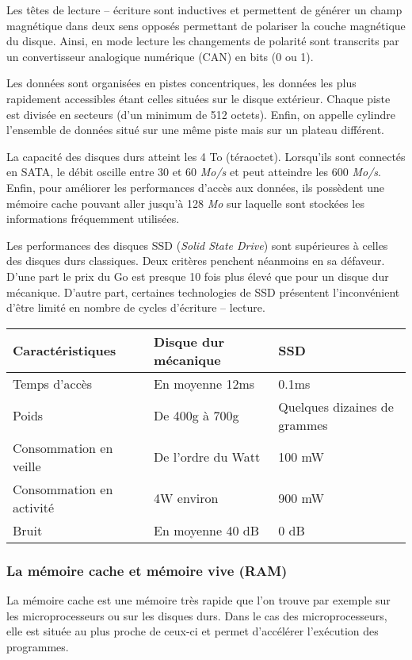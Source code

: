 Les têtes de lecture -- écriture sont inductives et permettent de générer un champ magnétique dans deux sens opposés permettant de polariser la couche magnétique du disque. Ainsi, en mode lecture les changements de polarité sont transcrits par un convertisseur analogique numérique (CAN) en bits (0 ou 1).

Les données sont organisées en pistes concentriques, les données les plus rapidement accessibles étant celles situées sur le disque extérieur. Chaque piste est divisée en secteurs (d'un minimum de 512 octets). Enfin, on appelle cylindre l'ensemble de données situé sur une même piste mais sur un plateau différent. 


La capacité des disques durs atteint les 4 To (téraoctet). Lorsqu'ils sont connectés en SATA, le débit oscille entre 30 et 60 \textit{Mo/s} et peut atteindre les 600 \textit{Mo/s}. Enfin, pour améliorer les performances d'accès aux données, ils possèdent une mémoire cache pouvant aller jusqu'à 128 \textit{Mo} sur laquelle sont stockées les informations fréquemment utilisées. 

Les performances des disques SSD (\textit{Solid State Drive}) sont supérieures à celles des disques durs classiques. Deux critères penchent néanmoins en sa défaveur. D'une part le prix du Go est presque 10 fois plus élevé 
que pour un disque dur mécanique. D'autre part, certaines technologies de SSD présentent l'inconvénient d'être limité en nombre de cycles d'écriture -- lecture.


\begin{center}
\begin{tabular}{|l|l|l|}
\hline
\textbf{Caractéristiques} & \textbf{Disque dur mécanique} & \textbf{SSD} \\ \hline
Temps d'accès & En moyenne 12ms & 0.1ms \\ \hline
Poids & De 400g à 700g & Quelques dizaines de grammes \\ \hline
Consommation en veille & De l'ordre du Watt & 100 mW \\ \hline
Consommation en activité & 4W environ & 900 mW \\ \hline
Bruit  & En moyenne 40 dB & 0 dB\\ \hline
\end{tabular}
\end{center}


\subsubsection{La mémoire cache et mémoire vive (RAM)}
La mémoire cache est une mémoire très rapide que l'on trouve par exemple sur les microprocesseurs ou sur les disques durs. Dans le cas des microprocesseurs, elle est située au plus proche de ceux-ci et permet d'accélérer l'exécution des programmes. 


